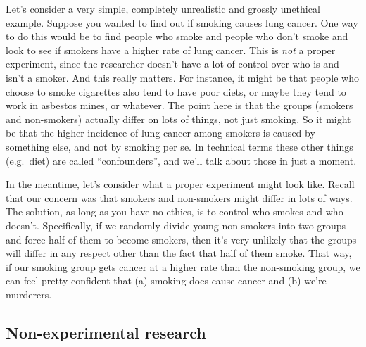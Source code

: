 \documentclass[
  a4paper,
]{book}
\begin{document}
Let's consider a very simple, completely unrealistic and grossly
unethical example. Suppose you wanted to find out if smoking causes lung
cancer. One way to do this would be to find people who smoke and people
who don't smoke and look to see if smokers have a higher rate of lung
cancer. This is \emph{not} a proper experiment, since the researcher
doesn't have a lot of control over who is and isn't a smoker. And this
really matters. For instance, it might be that people who choose to
smoke cigarettes also tend to have poor diets, or maybe they tend to
work in asbestos mines, or whatever. The point here is that the groups
(smokers and non-smokers) actually differ on lots of things, not just
smoking. So it might be that the higher incidence of lung cancer among
smokers is caused by something else, and not by smoking per se. In
technical terms these other things (e.g.~diet) are called
``confounders'', and we'll talk about those in just a moment.

In the meantime, let's consider what a proper experiment might look
like. Recall that our concern was that smokers and non-smokers might
differ in lots of ways. The solution, as long as you have no ethics, is
to control who smokes and who doesn't. Specifically, if we randomly
divide young non-smokers into two groups and force half of them to
become smokers, then it's very unlikely that the groups will differ in
any respect other than the fact that half of them smoke. That way, if
our smoking group gets cancer at a higher rate than the non-smoking
group, we can feel pretty confident that (a) smoking does cause cancer
and (b) we're murderers.

\hypertarget{non-experimental-research}{%
\subsection{Non-experimental research}\label{non-experimental-research}}
\end{document}
